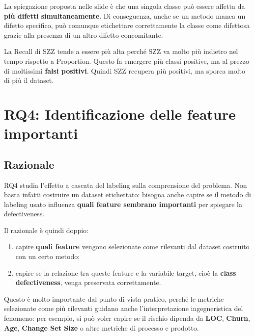 \begin{notaslide}
La spiegazione proposta nelle slide è che una singola classe può essere affetta da \textbf{più difetti simultaneamente}. Di conseguenza, anche se un metodo manca un difetto specifico, può comunque etichettare correttamente la classe come difettosa grazie alla presenza di un altro difetto concomitante.
\end{notaslide}

\begin{notaprof}
La Recall di SZZ tende a essere più alta perché SZZ va molto più indietro nel tempo rispetto a Proportion. Questo fa emergere più classi positive, ma al prezzo di moltissimi \textbf{falsi positivi}. Quindi SZZ recupera più positivi, ma sporca molto di più il dataset.
\end{notaprof}

\section{RQ4: Identificazione delle feature importanti}

\subsection{Razionale}

RQ4 studia l'effetto a cascata del labeling sulla comprensione del problema. Non basta infatti costruire un dataset etichettato: bisogna anche capire se il metodo di labeling usato influenza \textbf{quali feature sembrano importanti} per spiegare la defectiveness.

Il razionale è quindi doppio:

\begin{enumerate}
    \item capire \textbf{quali feature} vengono selezionate come rilevanti dal dataset costruito con un certo metodo;
    \item capire se la relazione tra queste feature e la variabile target, cioè la \textbf{class defectiveness}, venga preservata correttamente.
\end{enumerate}

Questo è molto importante dal punto di vista pratico, perché le metriche selezionate come più rilevanti guidano anche l'interpretazione ingegneristica del fenomeno: per esempio, si può voler capire se il rischio dipenda da \textbf{LOC}, \textbf{Churn}, \textbf{Age}, \textbf{Change Set Size} o altre metriche di processo e prodotto.

